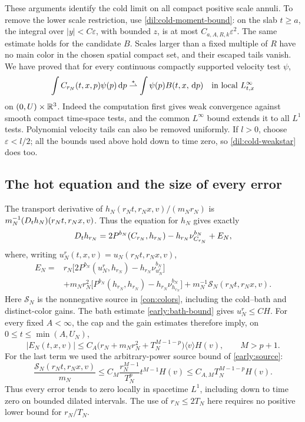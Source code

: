 These arguments identify the cold limit on all compact positive
scale annuli. To remove the lower scale restriction, use
\eqref{dil:cold-moment-bound}: on the slab \(t\geq a\), the integral
over \(|y|<C\varepsilon\), with bounded \(z\), is at most
\(C_{a,A,R,k}\varepsilon^2\). The same estimate holds for the
candidate \(B\). Scales larger than a fixed multiple of \(R\) have
no main color in the chosen spatial compact set, and their escaped
tails vanish. We have proved that for every continuous compactly
supported velocity test \(\psi\),
\begin{equation}\label{dil:cold-weakstar}
\int C_{r_N}(t,x,p)\psi(p)\,\mathrm d p
\stackrel{*}{\rightharpoonup}
\int\psi(p)B(t,x,\,\mathrm d p)
\quad\hbox{in local }L^\infty_{t,x}
\end{equation}
on \((0,U)\times\mathbb R^3\). Indeed the computation first gives weak
convergence against smooth compact time-space tests, and the common
\(L^\infty\) bound extends it to all \(L^1\) tests. Polynomial
velocity tails can also be removed uniformly. If \(l>0\), choose
\(\varepsilon<l/2\); all the bounds used above hold down to time
zero, so \eqref{dil:cold-weakstar} does too.

\subsection{The hot equation and the size of every error}

The transport derivative of \(h_N(r_Nt,r_Nx,v)/(m_Nr_N)\)
is \(m_N^{-1}(D_t h_N)(r_Nt,r_Nx,v)\). Thus the equation for
\(h_N\) gives exactly
\begin{equation}\label{dil:prelimit-equation}
D_t h_{r_N}
=2P^{b_N}(C_{r_N},h_{r_N})
 -h_{r_N}\nu^{b_N}_{C_{r_N}}+E_N,
\end{equation}
where, writing \(u_N^r(t,x,v)=u_N(r_Nt,r_Nx,v)\),
\[
\begin{split}
E_N={}&r_N\bigl[2P^{b_N}(u_N^r,h_{r_N})
                   -h_{r_N}\nu^{b_N}_{u_N^r}\bigr]\\
 &+m_Nr_N^2\bigl[P^{b_N}(h_{r_N},h_{r_N})
                   -h_{r_N}\nu^{b_N}_{h_{r_N}}\bigr]
   +m_N^{-1}\mathcal S_N(r_Nt,r_Nx,v).
\end{split}
\]
Here \(\mathcal S_N\) is the nonnegative source in
\eqref{con:colors}, including the cold--bath and distinct-color gains.
The bath estimate \eqref{early:bath-bound} gives \(u_N^r\le C H\). For every fixed
\(A<\infty\), the cap and the gain estimates therefore imply, on
\(0\le t\le\min(A,U_N)\),
\begin{equation}\label{dil:error-bounds}
 |E_N(t,x,v)|
 \le C_A\bigl(r_N+m_Nr_N^2+T_N^{M-1-p}\bigr)
             \langle v\rangle H(v),
 \qquad M>p+1.
\end{equation}
For the last term we used the arbitrary-power source bound of
\eqref{early:source}:
\[
 \frac{\mathcal S_N(r_Nt,r_Nx,v)}{m_N}
 \le C_M\frac{r_N^{M-1}}{T_N^p}t^{M-1}H(v)
 \le C_{A,M}T_N^{M-1-p}H(v).
\]
Thus every error tends to zero locally in spacetime \(L^1\), including
down to time zero on bounded dilated intervals. The use of
\(r_N\le2T_N\) here requires no positive lower bound for
\(r_N/T_N\).

